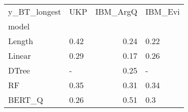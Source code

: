 \begin{tabular}{llrl}
\toprule
y\_BT\_longest &   UKP &  IBM\_ArgQ & IBM\_Evi \\
model  &       &           &         \\
\midrule
Length &  0.42 &      0.24 &    0.22 \\
Linear &  0.29 &      0.17 &    0.26 \\
DTree  &     - &      0.25 &       - \\
RF     &  0.35 &      0.31 &    0.34 \\
BERT\_Q &  0.26 &      0.51 &     0.3 \\
\bottomrule
\end{tabular}
